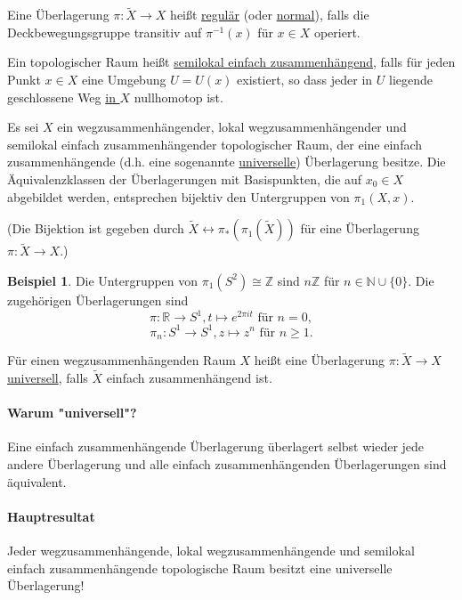 \documentclass[a4paper,11pt,notitlepage]{report}
\theoremstyle{definition}
\newtheorem{example}{Beispiel}[chapter]
\newcommand{\R}{{\ensuremath{\mathbb{R}}}}
\newcommand{\N}{{\ensuremath{\mathbb{N}}}}
\newcommand{\Z}{{\ensuremath{\mathbb{Z}}}}
\begin{document}
\begin{definition}
	Eine Überlagerung $\pi \colon \widetilde{X} \rightarrow X$ heißt \underline{regulär} (oder \underline{normal}), falls die Deckbewegungsgruppe transitiv auf $\pi^{-1}(x)$ für $x \in X$ operiert.
\end{definition}

\begin{definition}
	Ein topologischer Raum heißt \underline{semilokal einfach zusammenhängend}, falls für jeden Punkt $x \in X$ eine Umgebung $U=U(x)$ existiert, so dass jeder in $U$ liegende geschlossene Weg \underline{in $X$} nullhomotop ist.
\end{definition}

\begin{theorem}
	Es sei $X$ ein wegzusammenhängender, lokal wegzusammenhängender und semilokal einfach zusammenhängender topologischer Raum, der eine einfach zusammenhängende (d.h. eine sogenannte \underline{universelle}) Überlagerung besitze.
	\newline
	Die Äquivalenzklassen der Überlagerungen mit Basispunkten, die auf $x_0 \in X$ abgebildet werden, entsprechen bijektiv den Untergruppen von $\pi_1(X,x)$.
\end{theorem}

(Die Bijektion ist gegeben durch $\widetilde{X} \leftrightarrow \pi_*(\pi_1(\widetilde{X}))$ für eine Überlagerung $\pi \colon \widetilde{X} \rightarrow X$.)

\begin{example}
	Die Untergruppen von $\pi_1(S^2) \cong \Z$ sind $n \Z$ für $n \in \N \cup \{0\}$.
	\newline
	Die zugehörigen Überlagerungen sind 
	$$\pi \colon \R \rightarrow S^1, t \mapsto e^{2 \pi i t} \text{ für } n = 0,$$
	$$\pi_n \colon S^1 \rightarrow S^1, z \mapsto z^n \text{ für } n \geq 1.$$
\end{example}

\begin{definition}
	Für einen wegzusammenhängenden Raum $X$ heißt eine Überlagerung $\pi \colon \widetilde{X} \rightarrow X$ \underline{universell}, falls $\widetilde{X}$ einfach zusammenhängend ist.
\end{definition}

\paragraph{Warum "universell"?}
Eine einfach zusammenhängende Überlagerung überlagert selbst wieder jede andere Überlagerung und alle einfach zusammenhängenden Überlagerungen sind äquivalent.

\paragraph{Hauptresultat}
Jeder wegzusammenhängende, lokal wegzusammenhängende und semilokal einfach zusammenhängende topologische Raum besitzt eine universelle Überlagerung!
\end{document}

